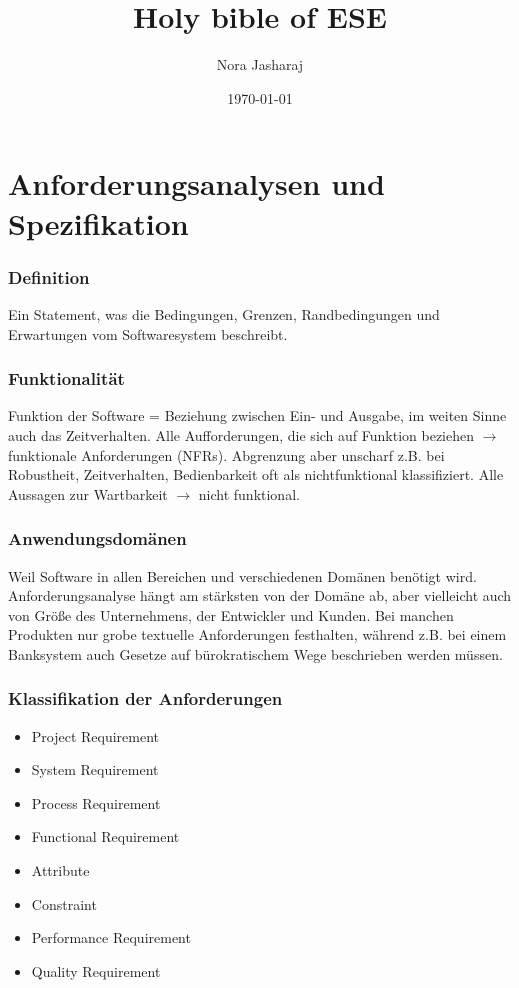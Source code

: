 \documentclass{book}
\title{Holy bible of ESE}
\author{Nora Jasharaj}
\date{\today}
\begin{document}
    \maketitle

    \tableofcontents

    \chapter{Anforderungsanalysen und Spezifikation}
    \subsection{Definition}
    Ein Statement, was die Bedingungen, Grenzen, Randbedingungen und Erwartungen vom Softwaresystem beschreibt.

    \subsection{Funktionalität}
    Funktion der Software = Beziehung zwischen Ein- und Ausgabe, im weiten Sinne auch das Zeitverhalten.
    Alle Aufforderungen, die sich auf Funktion beziehen $\rightarrow$ funktionale Anforderungen (NFRs).
    Abgrenzung aber unscharf z.B. bei Robustheit, Zeitverhalten, Bedienbarkeit oft als nichtfunktional klassifiziert.
    Alle Aussagen zur Wartbarkeit $\rightarrow$ nicht funktional.
    \subsection{Anwendungsdomänen}
    Weil Software in allen Bereichen und verschiedenen Domänen benötigt wird. Anforderungsanalyse hängt am stärksten von der Domäne ab, aber vielleicht auch von Größe des Unternehmens, der Entwickler und Kunden. Bei manchen Produkten nur grobe textuelle Anforderungen festhalten, während z.B. bei einem Banksystem auch Gesetze auf bürokratischem Wege beschrieben werden müssen.
    \subsection{Klassifikation der Anforderungen}
    \begin{itemize}
        \item Project Requirement
        \item System Requirement
        \item Process Requirement
        \item Functional Requirement
        \item Attribute
        \item Constraint
        \item Performance Requirement
        \item Quality Requirement
    \end{itemize}
\end{document}
